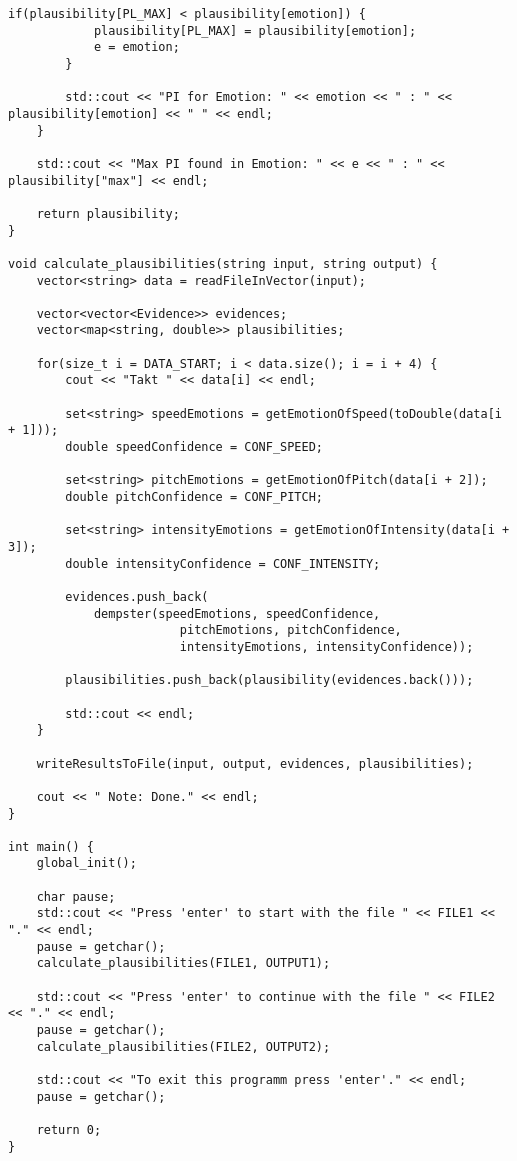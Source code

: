 \begin{lstlisting}[caption=Code aus Main.cpp, label=Bsp.1]
		if(plausibility[PL_MAX] < plausibility[emotion]) {
			plausibility[PL_MAX] = plausibility[emotion];
			e = emotion;
		}

		std::cout << "PI for Emotion: " << emotion << " : " << plausibility[emotion] << " " << endl;
	}

	std::cout << "Max PI found in Emotion: " << e << " : " << plausibility["max"] << endl;

	return plausibility;
}

void calculate_plausibilities(string input, string output) {
	vector<string> data = readFileInVector(input);

	vector<vector<Evidence>> evidences;
	vector<map<string, double>> plausibilities;

	for(size_t i = DATA_START; i < data.size(); i = i + 4) {
		cout << "Takt " << data[i] << endl;

		set<string> speedEmotions = getEmotionOfSpeed(toDouble(data[i + 1]));
		double speedConfidence = CONF_SPEED;

		set<string> pitchEmotions = getEmotionOfPitch(data[i + 2]);
		double pitchConfidence = CONF_PITCH;

		set<string> intensityEmotions = getEmotionOfIntensity(data[i + 3]);
		double intensityConfidence = CONF_INTENSITY;

		evidences.push_back(
			dempster(speedEmotions, speedConfidence,
						pitchEmotions, pitchConfidence,
						intensityEmotions, intensityConfidence));

		plausibilities.push_back(plausibility(evidences.back()));

		std::cout << endl;
	}

	writeResultsToFile(input, output, evidences, plausibilities);

	cout << " Note: Done." << endl;
}

int main() {
	global_init();

	char pause;
	std::cout << "Press 'enter' to start with the file " << FILE1 << "." << endl;
	pause = getchar();
	calculate_plausibilities(FILE1, OUTPUT1);
		
	std::cout << "Press 'enter' to continue with the file " << FILE2 << "." << endl;
	pause = getchar();
	calculate_plausibilities(FILE2, OUTPUT2);

	std::cout << "To exit this programm press 'enter'." << endl;
	pause = getchar();

	return 0;
}
\end{lstlisting}

